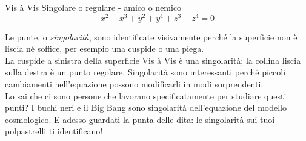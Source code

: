 \begin{surferPage}{Vis à Vis}
Singolare o regulare - amico o nemico\\
\smallskip
\[x^2	- x^3+ y^2+ y^4+ z^3- z^4	=  0\]

\vspace{0.3cm}
Le punte, o {\it singolarit\`a}, sono identificate visivamente perch\'e la superficie non \`e liscia n\'e soffice, per esempio una cuspide o una piega.\\
\vspace{0.3cm}
La cuspide a sinistra della superficie Vis \`a Vis \`e una singolarit\`a; la collina liscia sulla destra \`e un punto regolare. Singolarit\`a sono interessanti perch\'e piccoli cambiamenti nell'equazione possono modificarli in modi sorprendenti. \\

\vspace{0.3cm}
Lo sai che ci sono persone che lavorano specificatamente per studiare questi punti? I buchi neri e il Big Bang sono singolarit\`a dell'equazione del modello cosmologico. E adesso guardati la punta delle dita: le singolarit\`a sui tuoi polpastrelli ti identificano!
\end{surferPage}
